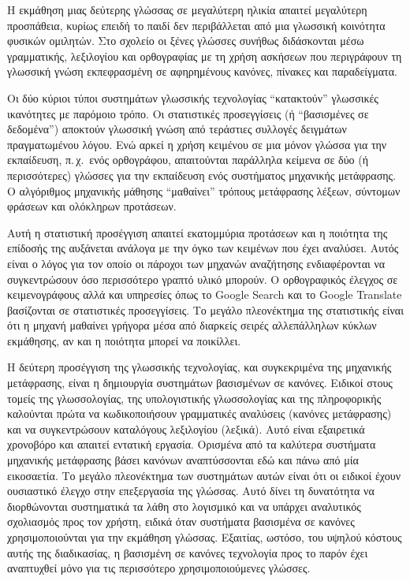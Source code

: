 \begin{multicols}{2}
Η εκμάθηση μιας δεύτερης γλώσσας σε μεγαλύτερη ηλικία απαιτεί μεγαλύτερη προσπάθεια, κυρίως επειδή το παιδί δεν περιβάλλεται από μια γλωσσική κοινότητα φυσικών ομιλητών. Στο σχολείο οι ξένες γλώσσες συνήθως διδάσκονται μέσω  γραμματικής, λεξιλογίου και ορθογραφίας με τη χρήση ασκήσεων που περιγράφουν τη γλωσσική γνώση εκπεφρασμένη σε αφηρημένους κανόνες, πίνακες και παραδείγματα. 

Οι δύο κύριοι τύποι συστημάτων γλωσσικής τεχνολογίας “κατακτούν” γλωσσικές ικανότητες με παρόμοιο τρόπο. Οι στατιστικές προσεγγίσεις (ή “βασισμένες σε δεδομένα”) αποκτούν γλωσσική γνώση από τεράστιες συλλογές δειγμάτων πραγματωμένου λόγου. Ενώ αρκεί η χρήση κειμένου σε μια μόνον γλώσσα για την εκπαίδευση, π.\,χ.~ενός ορθογράφου, απαιτούνται παράλληλα κείμενα σε δύο (ή περισσότερες) γλώσσες για την εκπαίδευση ενός συστήματος μηχανικής μετάφρασης. Ο  αλγόριθμος μηχανικής μάθησης “μαθαίνει” τρόπους μετάφρασης λέξεων, σύντομων φράσεων και ολόκληρων προτάσεων. 

Αυτή η στατιστική προσέγγιση απαιτεί εκατομμύρια προτάσεων και η ποιότητα της επίδοσής της αυξάνεται ανάλογα με την όγκο των κειμένων που έχει αναλύσει. Αυτός είναι ο λόγος για τον οποίο οι πάροχοι των μηχανών αναζήτησης ενδιαφέρονται να συγκεντρώσουν όσο περισσότερο γραπτό υλικό μπορούν. Ο ορθογραφικός έλεγχος σε κειμενογράφους αλλά και υπηρεσίες όπως το Google Search και το Google Translate  βασίζονται σε στατιστικές προσεγγίσεις. Το μεγάλο πλεονέκτημα της στατιστικής είναι ότι η μηχανή μαθαίνει γρήγορα μέσα από διαρκείς σειρές αλλεπάλληλων κύκλων εκμάθησης, αν και η ποιότητα μπορεί να ποικίλλει.

Η δεύτερη προσέγγιση της γλωσσικής τεχνολογίας, και συγκεκριμένα της μηχανικής μετάφρασης, είναι η δημιουργία συστημάτων βασισμένων σε κανόνες. Ειδικοί στους τομείς της γλωσσολογίας, της υπολογιστικής γλωσσολογίας και της πληροφορικής καλούνται πρώτα να κωδικοποιήσουν γραμματικές αναλύσεις (κανόνες μετάφρασης) και να συγκεντρώσουν καταλόγους λεξιλογίου (λεξικά). Αυτό είναι εξαιρετικά χρονοβόρο και απαιτεί εντατική εργασία. Ορισμένα από τα καλύτερα συστήματα μηχανικής μετάφρασης βάσει κανόνων αναπτύσσονται εδώ και πάνω από μία εικοσαετία. Το μεγάλο πλεονέκτημα των συστημάτων αυτών είναι ότι οι ειδικοί έχουν ουσιαστικό έλεγχο στην επεξεργασία της γλώσσας. Αυτό δίνει τη δυνατότητα να διορθώνονται συστηματικά τα λάθη στο λογισμικό και να υπάρχει αναλυτικός σχολιασμός προς τον χρήστη, ειδικά όταν συστήματα βασισμένα σε κανόνες χρησιμοποιούνται για την εκμάθηση γλώσσας. Εξαιτίας, ωστόσο, του υψηλού κόστους αυτής της διαδικασίας, η βασισμένη σε  κανόνες τεχνολογία προς το παρόν έχει αναπτυχθεί μόνο για τις περισσότερο χρησιμοποιούμενες γλώσσες. 


\end{multicols}
